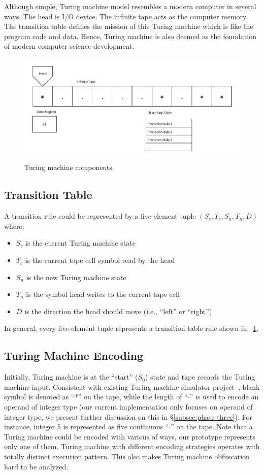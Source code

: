 Although simple, Turing machine model resembles a modern computer in several
ways. The head is I/O device. The infinite tape acts as the computer memory. The
transition table defines the mission of this Turing machine which is like the
program code and data. Hence, Turing machine is also deemed as the foundation of
modern computer science development.

\begin{figure}
 \includegraphics[width=0.9\linewidth]{TM.pdf}
 \caption{Turing machine components.}
 \label{fig:three}
\end{figure}

\subsection{Transition Table}
A transition rule could be represented by a five-element tuple $(S_c, T_c, S_n,
T_n, D)$ where:

\begin{itemize}
  \item \(S_c\) is the current Turing machine state
  \item \(T_c\) is the current tape cell symbol read by the head
  \item \(S_n\) is the new Turing machine state
  \item \(T_n\) is the symbol head writes to the current tape cell
  \item \(D\) is the direction the head should move (i.e., ``left'' or
    ``right'')
\end{itemize}

In general, every five-element tuple represents a transition table rule shown in
\F~\ref{fig:three}.

\subsection{Turing Machine Encoding}
Initially, Turing machine is at the ``start'' (\(S_0\)) state and tape records
the Turing machine input. Consistent with existing Turing machine simulator
project~\cite{SingleTape}, blank symbol is denoted as ``*'' on the tape, while
the length of ``$\cdot$'' is used to encode an operand of integer type (our
current implementation only focuses on operand of integer type, we present
further discussion on this in \S\ref{subsec:phase-three}). For instance, integer
5 is represented as five continuous ``$\cdot$'' on the tape. Note that a Turing
machine could be encoded with various of ways, our prototype represents only one
of them. Turing machine with different encoding strategies operates with totally
distinct execution pattern. This also makes Turing machine obfuscation hard to
be analyzed.

